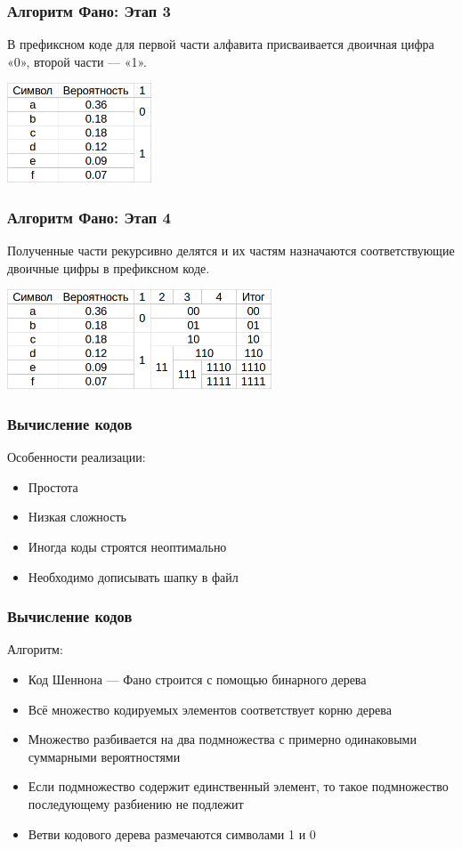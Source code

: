 \documentclass[10pt,pdf,hyperref={unicode}]{beamer}
\begin{document}
\begin{frame}
	\frametitle{Алгоритм Фано: Этап 3}
	В префиксном коде для первой части алфавита присваивается двоичная цифра «0», второй части — «1».
	\newline\newline
	\centerline{\includegraphics[height=8em]{alg2.png}}
\end{frame}

\begin{frame}
	\frametitle{Алгоритм Фано: Этап 4}
	Полученные части рекурсивно делятся и их частям назначаются соответствующие двоичные цифры в префиксном коде.
	\newline\newline
	\centerline{\includegraphics[height=8em]{alg3.png}}
\end{frame}

\begin{frame}
	\frametitle{Вычисление кодов}
	Особенности реализации:
	\begin{itemize}
		\item Простота
		\item Низкая сложность
		\item Иногда коды строятся неоптимально
		\item Необходимо дописывать шапку в файл
	\end{itemize}
\end{frame}
\begin{frame}
	\frametitle{Вычисление кодов}
	Алгоритм:
	\begin{itemize}
		\item Код Шеннона — Фано строится с помощью бинарного дерева
		\item Всё множество кодируемых элементов соответствует корню дерева
		\item Множество разбивается на два подмножества с примерно одинаковыми суммарными вероятностями
		\item Если подмножество содержит единственный элемент, то такое подмножество последующему разбиению не подлежит
		\item Ветви кодового дерева размечаются символами 1 и 0
	\end{itemize}
\end{frame}
\end{document}
